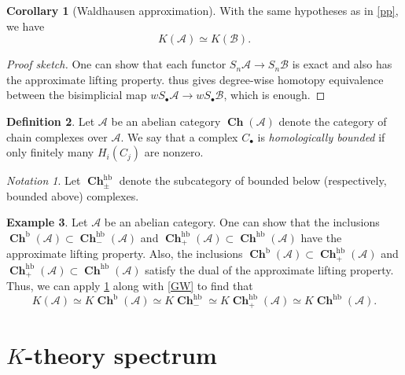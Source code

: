 \documentclass[10pt,letterpaper,cm]{nupset}
\theoremstyle{definition}
\newtheorem{definition}{Definition}[section]
\newtheorem{exmp}[definition]{Example}
\theoremstyle{theorem}
\newtheorem{corollary}[definition]{Corollary}
\theoremstyle{remark}
\newtheorem*{notation}{Notation}
\newcommand{\1}{\mathbf{1}}
\renewcommand{\a}{\mathscr{A}}
\renewcommand{\b}{\mathscr{B}}
\newcommand{\0}{\vec 0}
\DeclareMathOperator{\hb}{hb}
\DeclareMathOperator{\bo}{b}
\DeclareMathOperator{\ch}{\mathbf{Ch}}
\begin{document}
\begin{corollary}[Waldhausen approximation]\label{approx}
With the same hypotheses as in \cref{pp}, we have $$K(\a) \simeq K(\b).$$
\end{corollary}
\begin{proof}[Proof sketch]
One can show that each functor $S_n \a \to S_n \b$ is exact and also has the approximate lifting property.   thus gives degree-wise homotopy equivalence between the bisimplicial map $wS_{\bullet}\a \to wS_{\bullet} \b$, which is enough. 
\end{proof}

\smallskip

\begin{definition}
Let $\a$ be an abelian category $\ch(\a)$ denote the category of chain complexes over $\a$. We say that a complex $C_{\bullet}$ is \textit{homologically bounded} if only finitely many $H_i(C_j)$ are nonzero. 
\end{definition}

\begin{notation}
Let $\ch_{\pm}^{\hb}$ denote the subcategory of bounded below (respectively, bounded above) complexes. 
\end{notation}

\begin{exmp}
Let $\a$ be an abelian category. One can show that the inclusions $\ch^{\bo}(\a) \subset \ch_{-}^{\hb}(\a)$ and $\ch_+^{\hb}(\a)\subset \ch^{\hb}(\a)$ have the approximate lifting property. Also, the inclusions $\ch^{\bo}(\a) \subset \ch_+^{\hb}(\a)$ and $\ch_+^{\hb}(\a)\subset \ch^{\hb}(\a)$ satisfy the dual of the approximate lifting property. Thus, we can apply \cref{approx} along with \cref{GW} to find that $$  K(\a) \simeq K\ch^{\bo}(\a) \simeq  K\ch_{-}^{\hb}\simeq K\ch_{+}^{\hb}(\a) \simeq K \ch^{\hb}(\a).$$
\end{exmp}

\section{$K$-theory spectrum}
\end{document}
